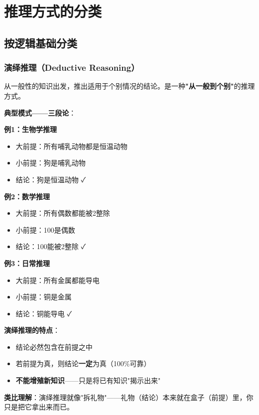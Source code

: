 \section{推理方式的分类}

\subsection{按逻辑基础分类}

\subsubsection{演绎推理（Deductive Reasoning）}
\begin{conceptbox}
从一般性的知识出发，推出适用于个别情况的结论。是一种\textbf{"从一般到个别"}的推理方式。
\end{conceptbox}

\textbf{典型模式——三段论}：

\begin{examplebox}[例子：三段论的生活应用]
\textbf{例1：生物学推理}
\begin{itemize}[itemsep=0pt]
    \item 大前提：所有哺乳动物都是恒温动物
    \item 小前提：狗是哺乳动物
    \item 结论：狗是恒温动物 ✓
\end{itemize}

\textbf{例2：数学推理}
\begin{itemize}[itemsep=0pt]
    \item 大前提：所有偶数都能被2整除
    \item 小前提：100是偶数
    \item 结论：100能被2整除 ✓
\end{itemize}

\textbf{例3：日常推理}
\begin{itemize}[itemsep=0pt]
    \item 大前提：所有金属都能导电
    \item 小前提：铜是金属
    \item 结论：铜能导电 ✓
\end{itemize}
\end{examplebox}

\begin{tipbox}
\textbf{演绎推理的特点}：
\begin{itemize}[itemsep=0pt]
    \item 结论必然包含在前提之中
    \item 若前提为真，则结论\textbf{一定}为真（100\%可靠）
    \item \textbf{不能增殖新知识}——只是将已有知识"揭示出来"
\end{itemize}

\textbf{类比理解}：演绎推理就像"拆礼物"——礼物（结论）本来就在盒子（前提）里，你只是把它拿出来而已。
\end{tipbox}

